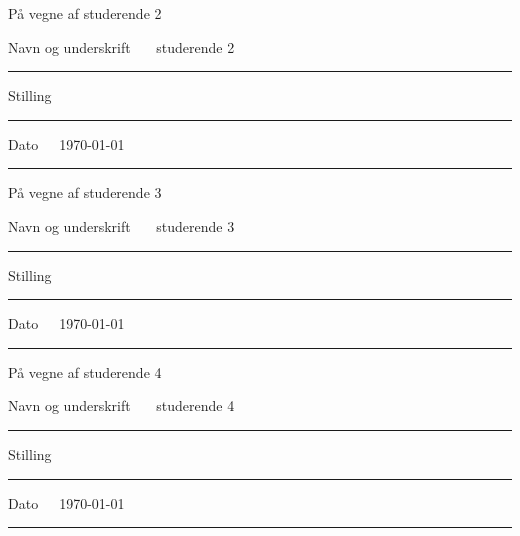\documentclass[11pt, a4paper]{article}
\newcommand{\studerendeTO}{ studerende 2 }	 		%
\newcommand{\studerendeTRE}{ studerende 3 }	 		%
\newcommand{\studerendeFIRE}{ studerende 4 }	 	%
\begin{document}
\vspace{5mm}
På vegne af \studerendeTO

Navn og underskrift~~~\studerendeTO
\vspace{1mm}
\hrule
\vspace{5mm}
Stilling~~~
\vspace{1mm}
\hrule
\vspace{5mm}
Dato~~~\today
\vspace{1mm}
\hrule


\vspace{5mm}
På vegne af \studerendeTRE

Navn og underskrift~~~\studerendeTRE
\vspace{1mm}
\hrule
\vspace{5mm}
Stilling~~~
\vspace{1mm}
\hrule
\vspace{5mm}
Dato~~~\today
\vspace{1mm}
\hrule


\vspace{5mm}
På vegne af \studerendeFIRE

Navn og underskrift~~~\studerendeFIRE
\vspace{1mm}
\hrule
\vspace{5mm}
Stilling~~~
\vspace{1mm}
\hrule
\vspace{5mm}
Dato~~~\today
\vspace{1mm}
\hrule
\end{document}
